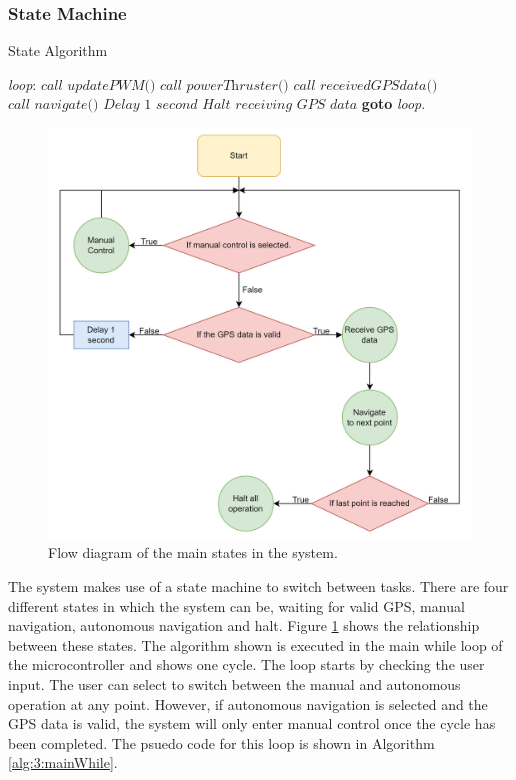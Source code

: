 		\subsubsection{State Machine}
		\begin{algorithm}[!hb]
			\caption{State Algorithm}
			\label{alg:3:mainWhile}
			\begin{algorithmic}[1]
				\BState \emph{loop}:
				\State $\textit{call updatePWM()}$
				\State $\textit{call powerThruster()}$
				\Else 
				\State $\textit{call receivedGPSdata()}$
				\State $\textit{call navigate()}$
				\Else
				\State $\textit{Delay 1 second}$
				\EndIf
				\State $\textit{Halt receiving GPS data}$
				\EndIf
				\EndIf
				\State \textbf{goto} \emph{loop}.
			\end{algorithmic}
		\end{algorithm}
	\begin{figure}[!hb]
		\begin{center}
			\includegraphics[width = 0.66\linewidth]{figures/statemachine.png}
			\caption{Flow diagram of the main states in the system.}
			\label{fig:3:stateMachine}
		\end{center}
	\end{figure}
		The system makes use of a state machine to switch between tasks. There are four different states in which the system can be, waiting for valid GPS, manual navigation, autonomous navigation and halt. Figure \ref{fig:3:stateMachine} shows the relationship between these states. The algorithm shown is executed in the main while loop of the microcontroller and shows one cycle. The loop starts by checking the user input. The user can select to switch between the manual and autonomous operation at any point. However, if autonomous navigation is selected and the GPS data is valid, the system will only enter manual control once the cycle has been completed. The psuedo code for this loop is shown in Algorithm \ref{alg:3:mainWhile}.
		
